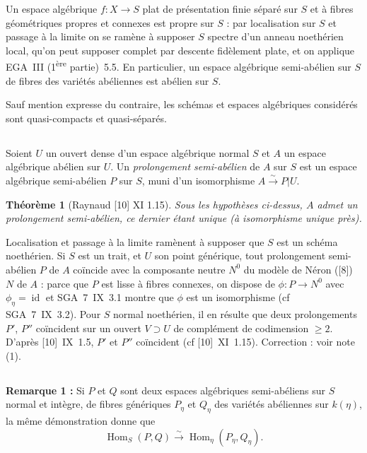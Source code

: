 \documentclass[12pt,a4paper]{article}
\theoremstyle{plain}
\newtheorem{theorem}{Théorème}[section]
\theoremstyle{definition}
\theoremstyle{remark}
\DeclareMathOperator{\Hom}{Hom}
\DeclareMathOperator{\id}{id}
\begin{document}
Un espace algébrique $f : X \to S$ plat de présentation finie séparé sur $S$ et à fibres géométriques propres et connexes est propre sur $S$ : par localisation sur $S$ et passage à la limite on se ramène à supposer $S$ spectre d'un anneau noethérien local, qu'on peut supposer complet par descente fidèlement plate, et on applique EGA~III (1\textsuperscript{ère} partie)~5.5. En particulier, un espace algébrique semi-abélien sur $S$ de fibres des variétés abéliennes est abélien sur $S$.

Sauf mention expresse du contraire, les schémas et espaces algébriques considérés sont quasi-compacts et quasi-séparés.

\subsection{} Soient $U$ un ouvert dense d'un espace algébrique normal $S$ et $A$ un espace algébrique abélien sur $U$. Un \emph{prolongement semi-abélien} de $A$ sur $S$ est un espace algébrique semi-abélien $P$ sur $S$, muni d'un isomorphisme $A \xrightarrow{\sim} P|U$.

\begin{theorem}[Raynaud {[10] XI 1.15}]
Sous les hypothèses ci-dessus, $A$ admet un prolongement semi-abélien, ce dernier étant unique (à isomorphisme unique près).
\end{theorem}

Localisation et passage à la limite ramènent à supposer que $S$ est un schéma noethérien. Si $S$ est un trait, et $U$ son point générique, tout prolongement semi-abélien $P$ de $A$ coïncide avec la composante neutre $N^0$ du modèle de Néron ([8]) $N$ de $A$ : parce que $P$ est lisse à fibres connexes, on dispose de $\phi : P \to N^0$ avec $\phi_\eta = \id$ et SGA~7~IX~3.1 montre que $\phi$ est un isomorphisme (cf SGA~7~IX~3.2). Pour $S$ normal noethérien, il en résulte que deux prolongements $P'$, $P''$ coïncident sur un ouvert $V \supset U$ de complément de codimension $\geq 2$. D'après [10]~IX~1.5, $P'$ et $P''$ coïncident (cf [10]~XI~1.15). Correction : voir note (1).

\subsection{}

\textbf{Remarque 1 :} Si $P$ et $Q$ sont deux espaces algébriques semi-abéliens sur $S$ normal et intègre, de fibres génériques $P_\eta$ et $Q_\eta$ des variétés abéliennes sur $k(\eta)$, la même démonstration donne que
\[
\Hom_S(P,Q) \xrightarrow{\sim} \Hom_\eta(P_\eta, Q_\eta).
\]
\end{document}
